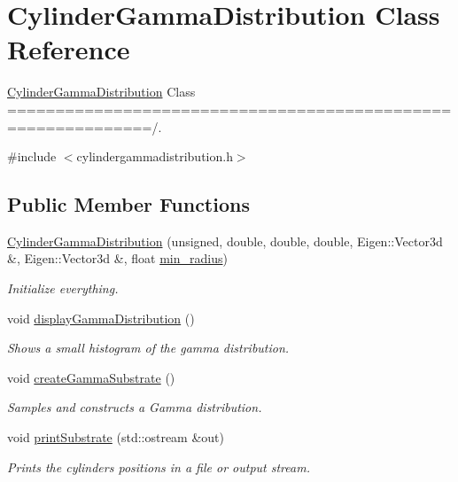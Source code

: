 \hypertarget{class_cylinder_gamma_distribution}{}\section{Cylinder\+Gamma\+Distribution Class Reference}
\label{class_cylinder_gamma_distribution}


\hyperlink{class_cylinder_gamma_distribution}{Cylinder\+Gamma\+Distribution} Class =============================================================/.  




{\ttfamily \#include $<$cylindergammadistribution.\+h$>$}

\subsection*{Public Member Functions}
\begin{DoxyCompactItemize}
\item 
\hyperlink{class_cylinder_gamma_distribution_a7578f5f0fb11398ec5bf5007047f4b81}{Cylinder\+Gamma\+Distribution} (unsigned, double, double, double, Eigen\+::\+Vector3d \&, Eigen\+::\+Vector3d \&, float \hyperlink{class_cylinder_gamma_distribution_aece7d3ec40d3dbb3a2ecd1bd88c5a694}{min\+\_\+radius})
\begin{DoxyCompactList}\small\item\em Initialize everything. \end{DoxyCompactList}\item 
\mbox{\label{class_cylinder_gamma_distribution_a3408ed30966550c10810a0a6cbbfd3c2}} 
void \hyperlink{class_cylinder_gamma_distribution_a3408ed30966550c10810a0a6cbbfd3c2}{display\+Gamma\+Distribution} ()
\begin{DoxyCompactList}\small\item\em Shows a small histogram of the gamma distribution. \end{DoxyCompactList}\item 
\mbox{\label{class_cylinder_gamma_distribution_ad93e569b24e3c6b1266ecf79bd18dec9}} 
void \hyperlink{class_cylinder_gamma_distribution_ad93e569b24e3c6b1266ecf79bd18dec9}{create\+Gamma\+Substrate} ()
\begin{DoxyCompactList}\small\item\em Samples and constructs a Gamma distribution. \end{DoxyCompactList}\item 
void \hyperlink{class_cylinder_gamma_distribution_a2345c03be0b0c934efe02e4234c65fd1}{print\+Substrate} (std\+::ostream \&out)
\begin{DoxyCompactList}\small\item\em Prints the cylinders positions in a file or output stream. \end{DoxyCompactList}\end{DoxyCompactItemize}
